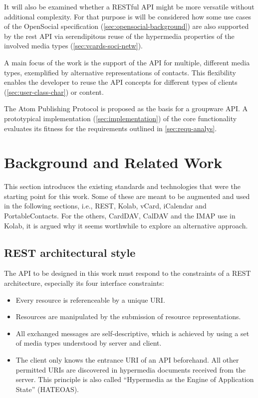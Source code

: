 \documentclass[11pt,a4paper,headsepline,twoside]{scrartcl}		%
\newcommand{\citeurl}[2]{\url{#1} (#2)}
\begin{document}
It will also be examined whether a RESTful API might be more versatile without
additional complexity. For that purpose is will be considered how some use
cases of the OpenSocial specification (\autoref{sec:opensocial-background}) are
also supported by the rest API via serendipitous reuse of the hypermedia
properties of the involved media types (\autoref{sec:vcards-soci-netw}).

A main focus of the work is the support of the API for multiple, different
media types, exemplified by alternative representations of contacts. This
flexibility enables the developer to reuse the API concepts for different types
of clients (\autoref{sec:user-class-char}) or content.

The Atom Publishing Protocol is proposed as the basis for a groupware API. A
prototypical implementation (\autoref{sec:implementation}) of the core
functionality evaluates its fitness for the requirements outlined in
\autoref{sec:requ-analys}.


\section{Background and Related Work}
\label{sec:backgr-relat-work}

This section introduces the existing standards and technologies that were the
starting point for this work. Some of these are meant to be augmented and used
in the following sections, i.e., REST, Kolab, vCard, iCalendar and
PortableContacts. For the others, CardDAV, CalDAV and the IMAP use in Kolab, it
is argued why it seems worthwhile to explore an alternative approach.

\subsection{REST architectural style}

The API to be designed in this work must respond to the constraints of a REST
architecture, especially its four interface
constraints\cite[sec. 5.1.5]{Fielding2000}:

\begin{itemize}
\item Every resource is referenceable by a unique URI.
\item Resources are manipulated by the submission of resource representations.
\item All exchanged messages are self-descriptive, which is achieved by using a
  set of media types understood by server and client.
\item The client only knows the entrance URI of an API beforehand. All other
  permitted URIs are discovered in hypermedia documents received from the
  server. This principle is also called ``Hypermedia as the Engine of
  Application State'' (HATEOAS).
\end{itemize}
\end{document}
